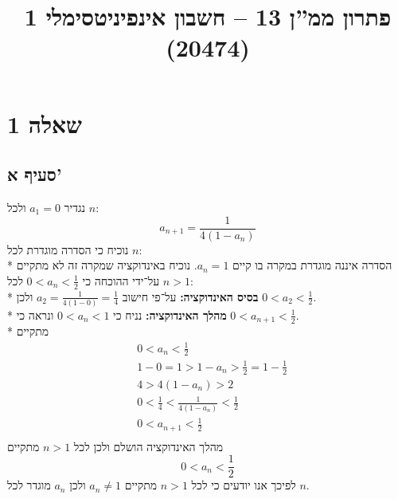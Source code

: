 
\title{פתרון ממ''ן 13 – חשבון אינפיניטסימלי 1 (20474)}


\maketitle
\section{שאלה 1}
\subsection{סעיף א'}
נגדיר $a_1 = 0$ ולכל $n$:
\[
	a_{n + 1} = \frac{1}{4(1 - a_n)}
\]
נוכיח כי הסדרה מוגדרת לכל $n$: \\*
הסדרה איננה מוגדרת במקרה בו קיים $a_n = 1$.
נוכיח באינדוקציה שמקרה זה לא מתקיים על־ידי ההוכחה כי $0 < a_n < \frac{1}{2}$ לכל $n > 1$: \\*
\textbf{בסיס האינדוקציה:} על־פי חישוב $a_2 = \frac{1}{4(1 - 0)} = \frac{1}{4}$ ולכן $0 < a_2 < \frac{1}{2}$. \\*
\textbf{מהלך האינדוקציה:} נניח כי $0 < a_n < 1$ ונראה כי $0 < a_{n + 1} < \frac{1}{2}$. \\*
מתקיים
\begin{align*}
	& 0 < a_n < \frac{1}{2} \\
	& 1 - 0 = 1 > 1 - a_n > \frac{1}{2} = 1 - \frac{1}{2} \\
	& 4 > 4(1 - a_n) > 2 \\
	& 0 < \frac{1}{4} < \frac{1}{4(1 - a_n)} < \frac{1}{2} \\
	& 0 < a_{n + 1} < \frac{1}{2} \\
\end{align*}
מהלך האינדוקציה הושלם ולכן לכל $n > 1$ מתקיים
$$
	0 < a_n < \frac{1}{2}
$$
לפיכך אנו יודעים כי לכל $n > 1$ מתקיים $a_n \ne 1$ ולכן $a_n$ מוגדר לכל $n$.

